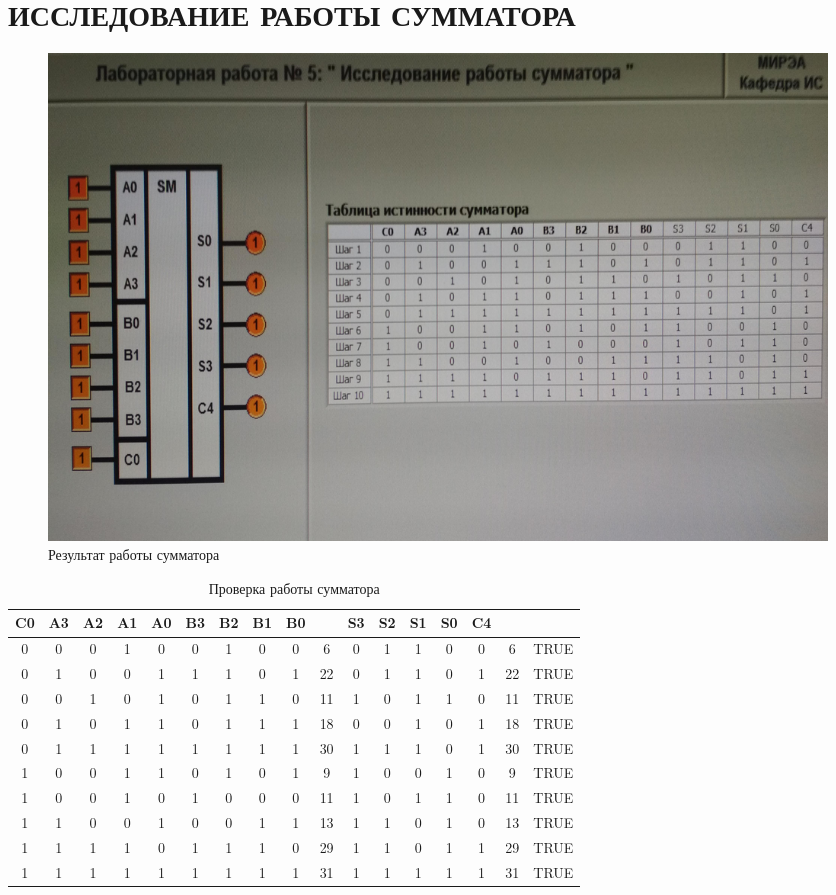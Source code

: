 \section{ИССЛЕДОВАНИЕ РАБОТЫ СУММАТОРА}

\begin{figure}[H]
	\centering
	\includegraphics[width=0.95\linewidth]{imgs/5/1}
	\caption{Результат работы сумматора}
	\label{fig:5_}
\end{figure}

\begin{table}[H]
	\centering
	\caption{Проверка работы сумматора}
	\label{tab:lab_05}
	\begin{tabular}{|c|c|c|c|c|c|c|c|c|c|c|c|c|c|c|c|c|}
		\hline
		C0 & A3 & A2 & A1 & A0 & B3 & B2 & B1 & B0 &    & S3 & S2 & S1 & S0 & C4 &    &      \\ \hline
		0  & 0  & 0  & 1  & 0  & 0  & 1  & 0  & 0  & 6  & 0  & 1  & 1  & 0  & 0  & 6  & TRUE \\ \hline
		0  & 1  & 0  & 0  & 1  & 1  & 1  & 0  & 1  & 22 & 0  & 1  & 1  & 0  & 1  & 22 & TRUE \\ \hline
		0  & 0  & 1  & 0  & 1  & 0  & 1  & 1  & 0  & 11 & 1  & 0  & 1  & 1  & 0  & 11 & TRUE \\ \hline
		0  & 1  & 0  & 1  & 1  & 0  & 1  & 1  & 1  & 18 & 0  & 0  & 1  & 0  & 1  & 18 & TRUE \\ \hline
		0  & 1  & 1  & 1  & 1  & 1  & 1  & 1  & 1  & 30 & 1  & 1  & 1  & 0  & 1  & 30 & TRUE \\ \hline
		1  & 0  & 0  & 1  & 1  & 0  & 1  & 0  & 1  & 9  & 1  & 0  & 0  & 1  & 0  & 9  & TRUE \\ \hline
		1  & 0  & 0  & 1  & 0  & 1  & 0  & 0  & 0  & 11 & 1  & 0  & 1  & 1  & 0  & 11 & TRUE \\ \hline
		1  & 1  & 0  & 0  & 1  & 0  & 0  & 1  & 1  & 13 & 1  & 1  & 0  & 1  & 0  & 13 & TRUE \\ \hline
		1  & 1  & 1  & 1  & 0  & 1  & 1  & 1  & 0  & 29 & 1  & 1  & 0  & 1  & 1  & 29 & TRUE \\ \hline
		1  & 1  & 1  & 1  & 1  & 1  & 1  & 1  & 1  & 31 & 1  & 1  & 1  & 1  & 1  & 31 & TRUE \\ \hline
	\end{tabular}
\end{table}

